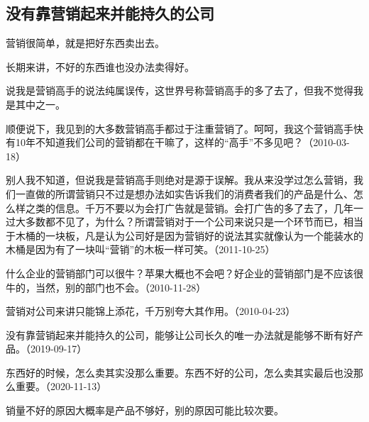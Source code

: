 \subsection{没有靠营销起来并能持久的公司}


营销很简单，就是把好东西卖出去。

长期来讲，不好的东西谁也没办法卖得好。

说我是营销高手的说法纯属误传，这世界号称营销高手的多了去了，但我不觉得我是其中之一。

顺便说下，我见到的大多数营销高手都过于注重营销了。呵呵，我这个营销高手快有10年不知道我们公司的营销都在干嘛了，这样的“高手”不多见吧？（2010-03-18）


别人我不知道，但说我是营销高手则绝对是源于误解。我从来没学过怎么营销，我们一直做的所谓营销只不过是想办法如实告诉我们的消费者我们的产品是什么、怎么样之类的信息。千万不要以为会打广告就是营销。会打广告的多了去了，几年一过大多数都不见了，为什么？所谓营销对于一个公司来说只是一个环节而已，相当于木桶的一块板，凡是认为公司好是因为营销好的说法其实就像认为一个能装水的木桶是因为有了一块叫“营销”的木板一样可笑。（2011-10-25）


什么企业的营销部门可以很牛？苹果大概也不会吧？好企业的营销部门是不应该很牛的，当然，别的部门也不会。（2010-11-28）


营销对公司来讲只能锦上添花，千万别夸大其作用。（2010-04-23）


没有靠营销起来并能持久的公司，能够让公司长久的唯一办法就是能够不断有好产品。（2019-09-17）

东西好的时候，怎么卖其实没那么重要。东西不好的公司，怎么卖其实最后也没那么重要。（2020-11-13）


销量不好的原因大概率是产品不够好，别的原因可能比较次要。


